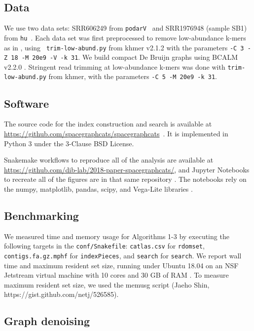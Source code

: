 \subsection*{Data}

We use two data sets: SRR606249 from
\texttt{podarV}~\cite{shakya2013comparative} and SRR1976948 (sample
SB1) from \texttt{hu}~\cite{hu}. Each data set was first preprocessed
to remove low-abundance k-mers as in \cite{Zhang2015}, using {\tt
  trim-low-abund.py} from khmer v2.1.2 \cite{Standage2017} with the
parameters {\tt -C 3 -Z 18 -M 20e9 -V -k 31}. We build compact De Bruijn
graphs using BCALM v2.2.0 \cite{bcalm}.  Stringent read trimming at
low-abundance k-mers was done with {\tt trim-low-abund.py} from khmer, with the
parameters {\tt -C 5 -M 20e9 -k 31}.

\subsection*{Software}

The source code for the index construction and search is available at
\url{https://github.com/spacegraphcats/spacegraphcats}~\cite{spacegraphcats}.
It is implemented in Python 3 under the 3-Clause BSD License.

Snakemake \cite{snakemake} workflows to reproduce all of the analysis
are available at
\url{https://github.com/dib-lab/2018-paper-spacegraphcats/}, and
Jupyter Notebooks to recreate all of the figures are in that same
repository \cite{jupyter}. The notebooks rely on the numpy,
matplotlib, pandas, scipy, and Vega-Lite libraries
\cite{numpy,matplotlib,pandas,scipy,vegalite}.

\subsection*{Benchmarking}

We measured time and memory usage for Algorithms 1-3 by executing the
following targets in the \sgc \texttt{conf/Snakefile}:
\texttt{catlas.csv} for \texttt{rdomset}, \texttt{contigs.fa.gz.mphf}
for \texttt{indexPieces}, and \texttt{search} for \texttt{search}.  We
report wall time and maximum resident set size, running under Ubuntu
18.04 on an NSF Jetstream virtual machine with 10 cores and 30 GB of
RAM \cite{jetstream1,jetstream2}. To measure maximum resident set
size, we used the memusg script (Jaeho Shin,
https://gist.github.com/netj/526585).

\subsection*{Graph denoising}

